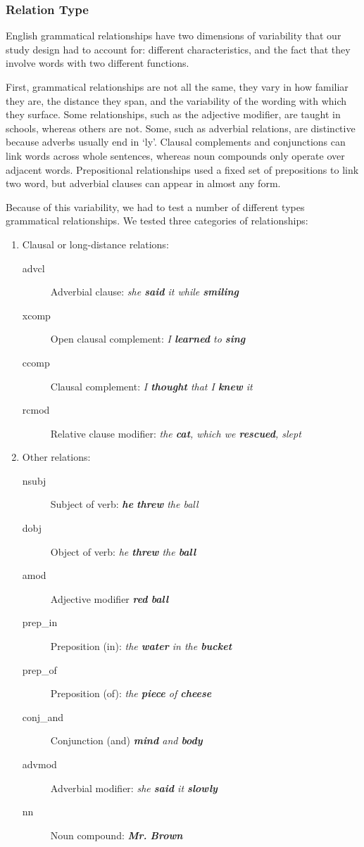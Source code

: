 \subsubsection{Relation Type}
English grammatical relationships have two dimensions of variability that our study design had to account for: different characteristics, and the fact that they involve words with two different functions.

First, grammatical relationships are not all the same, they vary in how familiar they are, the distance they span, and the variability of the wording with which they surface.  Some relationships, such as the adjective modifier, are taught in schools, whereas others are not. Some, such as adverbial relations, are distinctive because adverbs usually end in `ly'. Clausal complements and conjunctions can link words across whole sentences, whereas noun compounds only operate over adjacent words. Prepositional relationships used a fixed set of prepositions to link two word, but adverbial clauses can appear in almost any form.

Because of this variability, we had to test a number of different types grammatical relationships. We tested three categories of relationships:
\begin{enumerate}
\item Clausal or long-distance relations:
	\begin{description}
		\item[advcl] Adverbial clause: \emph{  she \textbf{said} it while \textbf{smiling}}
		\item [xcomp] Open clausal complement:  \emph{I \textbf{learned} to \textbf{sing} }
		\item [ccomp] Clausal complement:  \emph{ I \textbf{thought} that I \textbf{knew} it}
		\item [rcmod] Relative clause modifier:  \emph{the \textbf{cat}, which we \textbf{rescued}, slept }
	\end{description}
\item Other relations:
		\begin{description}
			\item[nsubj] Subject of verb: \emph{\textbf{he} \textbf{threw} the ball}
			\item [dobj] Object of verb:  \emph{ he \textbf{threw} the \textbf{ball}}
			\item [amod] Adjective modifier \emph{\textbf{red} \textbf{ball}}
			\item [prep\_in]  Preposition (in): \emph{ the \textbf{water} in the \textbf{bucket}}
			\item [prep\_of]	Preposition (of):  \emph{ the \textbf{piece} of \textbf{cheese}}
			\item [conj\_and]  Conjunction (and)  \emph{ \textbf{mind} and \textbf{body}}
		\item[advmod] Adverbial modifier: \emph{  she \textbf{said} it \textbf{slowly}}
		\item [nn] Noun compound:  \emph{ \textbf{Mr.}  \textbf{Brown}}
		\end{description}
\end{enumerate}

